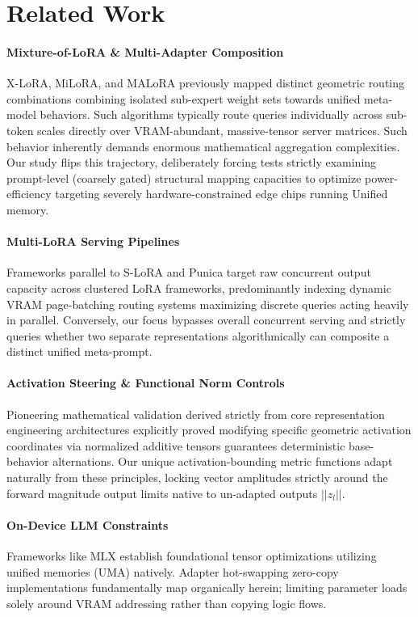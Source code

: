 \documentclass[11pt]{article}
\begin{document}
\section{Related Work}

\paragraph{Mixture-of-LoRA \& Multi-Adapter Composition}
X-LoRA, MiLoRA, and MALoRA previously mapped distinct geometric routing combinations combining isolated sub-expert weight sets towards unified meta-model behaviors. Such algorithms typically route queries individually across sub-token scales directly over VRAM-abundant, massive-tensor server matrices. Such behavior inherently demands enormous mathematical aggregation complexities. Our study flips this trajectory, deliberately forcing tests strictly examining prompt-level (coarsely gated) structural mapping capacities to optimize power-efficiency targeting severely hardware-constrained edge chips running Unified memory.

\paragraph{Multi-LoRA Serving Pipelines}
Frameworks parallel to S-LoRA and Punica target raw concurrent output capacity across clustered LoRA frameworks, predominantly indexing dynamic VRAM page-batching routing systems maximizing discrete queries acting heavily in parallel. Conversely, our focus bypasses overall concurrent serving and strictly queries whether two separate representations algorithmically can composite a distinct unified meta-prompt.

\paragraph{Activation Steering \& Functional Norm Controls}
Pioneering mathematical validation derived strictly from core representation engineering architectures explicitly proved modifying specific geometric activation coordinates via normalized additive tensors guarantees deterministic base-behavior alternations. Our unique activation-bounding metric functions adapt naturally from these principles, locking vector amplitudes strictly around the forward magnitude output limits native to un-adapted outputs $||z_l||$.

\paragraph{On-Device LLM Constraints}
Frameworks like MLX establish foundational tensor optimizations utilizing unified memories (UMA) natively. Adapter hot-swapping zero-copy implementations fundamentally map organically herein; limiting parameter loads solely around VRAM addressing rather than copying logic flows.
\end{document}
